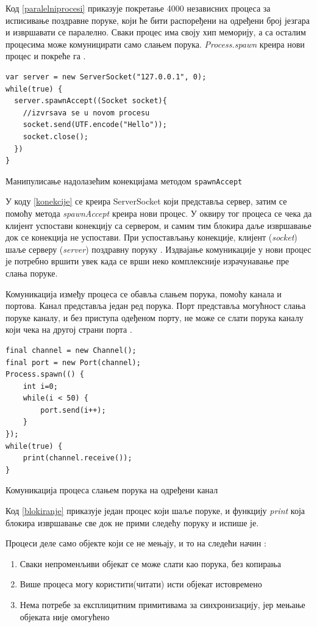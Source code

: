\documentclass[12pt,oneside]{memoir}
\begin{document}
Код \ref{paralelniprocesi} приказује покретање 4000 независних процеса за исписивање поздравне поруке, који ће бити распоређени на одређени број језгара и извршавати се паралелно. Сваки процес има своју хип меморију, а са осталим процесима може комуницирати само слањем порука. \textit{Process.spawn} креира нови процес и покреће га \cite{procesi_i_izolate}.

\begin{listing}
\begin{verbatim}
var server = new ServerSocket("127.0.0.1", 0);
while(true) {
  server.spawnAccept((Socket socket){
	//izvrsava se u novom procesu
	socket.send(UTF.encode("Hello"));
	socket.close();
  })
}
\end{verbatim}
\caption{Манипулисање надолазећим конекцијама методом \texttt{spawnAccept}}
\label{konekcije}
\end{listing}

У коду \ref{konekcije} се креира ServerSocket који представља сервер, затим се помоћу метода \textit{spawnAccept} креира нови процес. У оквиру тог процеса се чека да клијент успостави конекцију са сервером, и самим тим блокира даље извршавање док се конекција не успостави. При успостављању конекције, клијент (\textit{socket}) шаље серверу (\textit{server}) поздравну поруку \cite{Dartino}. Издвајање комуникације у нови процес је потребно вршити увек када се врши неко комплексније израчунавање пре слања поруке.

Комуникација између процеса се обавља слањем порука, помоћу канала и портова. Канал представља један ред порука. Порт представља могућност слања поруке каналу, и без приступа одеђеном порту, не може се слати порука каналу који чека на другој страни порта \cite{Dartino}.

\begin{listing}
\begin{verbatim}
final channel = new Channel();
final port = new Port(channel);
Process.spawn(() {
	int i=0;
	while(i < 50) {
		port.send(i++);
	}
});
while(true) {
	print(channel.receive());
}
\end{verbatim}
\caption{Комуникација процеса слањем порука на одређени канал}
\label{blokiranje}
\end{listing}

Код \ref{blokiranje} приказује један процес који шаље поруке, и функцију \textit{print} која блокира извршавање све док не прими следећу поруку и испише је.

Процеси деле само објекте који се не мењају, и то на следећи начин \cite{Dartino}:
\begin{enumerate}
\item Сваки непроменљиви објекат се може слати као порука, без копирања
\item Више процеса могу користити(читати) исти објекат истовремено
\item Нема потребе за експлицитним примитивама за синхронизацију, јер мењање објеката није омогућено
\end{enumerate}
\end{document}
